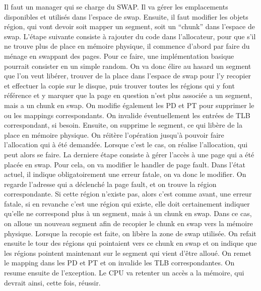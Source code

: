 \begin{correction}
\begin{itemize}
        Il faut un manager qui se charge du SWAP. Il va g\'erer les emplacements disponibles et utilis\'es dans l'espace de swap. Ensuite, il faut modifier les objets r\'egion, qui vont devoir soit mapper un segment, soit un ``chunk'' dans l'espace de swap. L'\'etape suivante consiste \`a rajouter du code dans l'allocateur, pour que s'il ne trouve plus de place en m\'emoire physique, il commence d'abord par faire du m\'enage en swappant des pages. Pour ce faire, une impl\'ementation basique pourrait consister en un simple random. On va donc \'elire au hasard un segment que l'on veut lib\'erer, trouver de la place dans l'espace de swap pour l'y recopier et effectuer la copie sur le disque, puis trouver toutes les r\'egions qui y font r\'ef\'erence et y marquer que la page en question n'est plus associ\'ee a un segment, mais a un chunk en swap. On modifie \'egalement les PD et PT pour supprimer le ou les mappings correspondants. On invalide \'eventuellement les entr\'ees de TLB correspondant, si besoin. Ensuite, on supprime le segment, ce qui lib\`ere de la place en m\'emoire physique. On r\'eit\`ere l'op\'eration jusqu'\`a pouvoir faire l'allocation qui \`a \'et\'e demand\'ee. Lorsque c'est le cas, on r\'ealise l'allocation, qui peut alors se faire. La derniere \'etape consiste \`a g\'erer l'acc\`es \`a une page qui a \'et\'e plac\'ee en swap. Pour cela, on va modifier le handler de page fault. Dans l'\'etat actuel, il indique obligatoirement une erreur fatale, on va donc le modifier. On regarde l'adresse qui a d\'eclench\'e la page fault, et on trouve la r\'egion correspondante. Si cette r\'egion n'existe pas, alors c'est comme avant, une erreur fatale, si en revanche c'est une r\'egion qui existe, elle doit certainement indiquer qu'elle ne correspond plus \`a un segment, mais \`a un chunk en swap. Dans ce cas, on alloue un nouveau segment afin de recopier le chunk en swap vers la m\'emoire physique. Lorsque la recopie est faite, on lib\`ere la zone de swap utilis\'ee. On refait ensuite le tour des r\'egions qui pointaient vers ce chunk en swap et on indique que les r\'egions pointent maintenant sur le segment qui vient d'\^etre allou\'e. On remet le mapping dans les PD et PT et on invalide les TLB correspondantes. On resume ensuite de l'exception. Le CPU va retenter un acc\`es a la m\'emoire, qui devrait ainsi, cette fois, r\'eussir. 

\end{itemize}

\end{correction}

